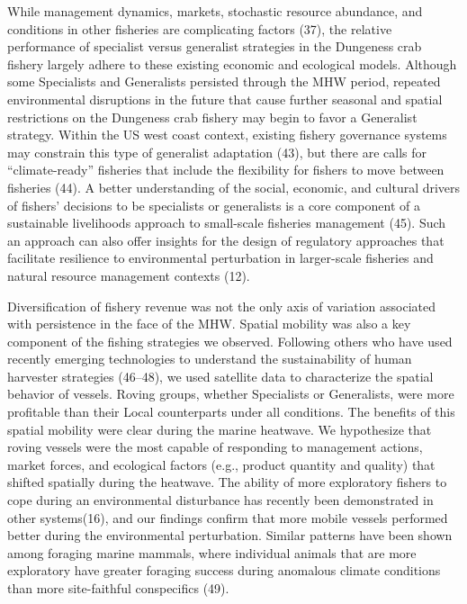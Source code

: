 \documentclass[9pt,twocolumn,twoside,lineno]{pnas-new}
\begin{document}
While management dynamics, markets, stochastic resource abundance, and
conditions in other fisheries are complicating factors (37), the
relative performance of specialist versus generalist strategies in the
Dungeness crab fishery largely adhere to these existing economic and
ecological models. Although some Specialists and Generalists persisted
through the MHW period, repeated environmental disruptions in the future
that cause further seasonal and spatial restrictions on the Dungeness
crab fishery may begin to favor a Generalist strategy. Within the US
west coast context, existing fishery governance systems may constrain
this type of generalist adaptation (43), but there are calls for
``climate-ready'' fisheries that include the flexibility for fishers to
move between fisheries (44). A better understanding of the social,
economic, and cultural drivers of fishers' decisions to be specialists
or generalists is a core component of a sustainable livelihoods approach
to small-scale fisheries management (45). Such an approach can also
offer insights for the design of regulatory approaches that facilitate
resilience to environmental perturbation in larger-scale fisheries and
natural resource management contexts (12).

Diversification of fishery revenue was not the only axis of variation
associated with persistence in the face of the MHW. Spatial mobility was
also a key component of the fishing strategies we observed. Following
others who have used recently emerging technologies to understand the
sustainability of human harvester strategies (46--48), we used satellite
data to characterize the spatial behavior of vessels. Roving groups,
whether Specialists or Generalists, were more profitable than their
Local counterparts under all conditions. The benefits of this spatial
mobility were clear during the marine heatwave. We hypothesize that
roving vessels were the most capable of responding to management
actions, market forces, and ecological factors (e.g., product quantity
and quality) that shifted spatially during the heatwave. The ability of
more exploratory fishers to cope during an environmental disturbance has
recently been demonstrated in other systems(16), and our findings
confirm that more mobile vessels performed better during the
environmental perturbation. Similar patterns have been shown among
foraging marine mammals, where individual animals that are more
exploratory have greater foraging success during anomalous climate
conditions than more site-faithful conspecifics (49).
\end{document}
